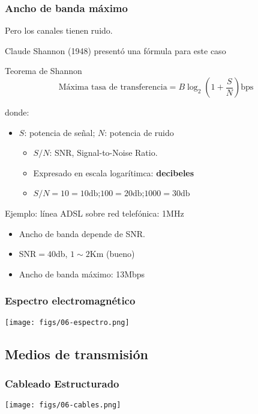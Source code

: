 \documentclass[letter]{beamer}
\begin{document}
\begin{frame}
  \frametitle{Ancho de banda máximo}

  Pero los canales tienen ruido.
  
  Claude Shannon (1948) presentó una fórmula para este caso
  
  \begin{alertblock}{Teorema de Shannon}
    \[\text{Máxima tasa de transferencia} = B \log_2 (1+\frac{S}{N}) \text{bps}\]
  \end{alertblock}
  donde:
  \begin{itemize}
    \item $S$: potencia de señal; $N$: potencia de ruido 
      \begin{itemize}
        \item $S/N$: SNR, Signal-to-Noise Ratio.
        \item Expresado en escala logarítimca: {\bf decibeles}
        \item $S/N=10=10\text{db}$;$100=20\text{db}$;$1000=30\text{db}$
      \end{itemize}
  \end{itemize}
  Ejemplo: línea ADSL sobre red telefónica: 1MHz
  \begin{itemize}
    \item Ancho de banda depende de SNR.
    \item SNR$=40$db, $1\sim 2$Km (bueno)
    \item Ancho de banda máximo: 13Mbps
  \end{itemize}

\end{frame}
\begin{frame}
  \frametitle{Espectro electromagnético}
  
  \begin{center}
    \texttt{[image: figs/06-espectro.png]}
  \end{center}

\end{frame}

\subsection{Medios de transmisión}

\begin{frame}
  \frametitle{Cableado Estructurado}

  \begin{center}
    \texttt{[image: figs/06-cables.png]}
  \end{center}

\end{frame}
\end{document}
